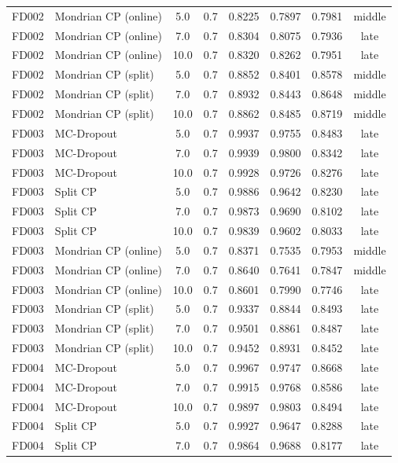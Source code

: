 \begin{table}[t]
\begin{tabular}{llcccccc}
FD002 & Mondrian CP (online) & 5.0 & 0.7 & 0.8225 & 0.7897 & 0.7981 & middle \\
FD002 & Mondrian CP (online) & 7.0 & 0.7 & 0.8304 & 0.8075 & 0.7936 & late \\
FD002 & Mondrian CP (online) & 10.0 & 0.7 & 0.8320 & 0.8262 & 0.7951 & late \\
FD002 & Mondrian CP (split) & 5.0 & 0.7 & 0.8852 & 0.8401 & 0.8578 & middle \\
FD002 & Mondrian CP (split) & 7.0 & 0.7 & 0.8932 & 0.8443 & 0.8648 & middle \\
FD002 & Mondrian CP (split) & 10.0 & 0.7 & 0.8862 & 0.8485 & 0.8719 & middle \\
FD003 & MC-Dropout & 5.0 & 0.7 & 0.9937 & 0.9755 & 0.8483 & late \\
FD003 & MC-Dropout & 7.0 & 0.7 & 0.9939 & 0.9800 & 0.8342 & late \\
FD003 & MC-Dropout & 10.0 & 0.7 & 0.9928 & 0.9726 & 0.8276 & late \\
FD003 & Split CP & 5.0 & 0.7 & 0.9886 & 0.9642 & 0.8230 & late \\
FD003 & Split CP & 7.0 & 0.7 & 0.9873 & 0.9690 & 0.8102 & late \\
FD003 & Split CP & 10.0 & 0.7 & 0.9839 & 0.9602 & 0.8033 & late \\
FD003 & Mondrian CP (online) & 5.0 & 0.7 & 0.8371 & 0.7535 & 0.7953 & middle \\
FD003 & Mondrian CP (online) & 7.0 & 0.7 & 0.8640 & 0.7641 & 0.7847 & middle \\
FD003 & Mondrian CP (online) & 10.0 & 0.7 & 0.8601 & 0.7990 & 0.7746 & late \\
FD003 & Mondrian CP (split) & 5.0 & 0.7 & 0.9337 & 0.8844 & 0.8493 & late \\
FD003 & Mondrian CP (split) & 7.0 & 0.7 & 0.9501 & 0.8861 & 0.8487 & late \\
FD003 & Mondrian CP (split) & 10.0 & 0.7 & 0.9452 & 0.8931 & 0.8452 & late \\
FD004 & MC-Dropout & 5.0 & 0.7 & 0.9967 & 0.9747 & 0.8668 & late \\
FD004 & MC-Dropout & 7.0 & 0.7 & 0.9915 & 0.9768 & 0.8586 & late \\
FD004 & MC-Dropout & 10.0 & 0.7 & 0.9897 & 0.9803 & 0.8494 & late \\
FD004 & Split CP & 5.0 & 0.7 & 0.9927 & 0.9647 & 0.8288 & late \\
FD004 & Split CP & 7.0 & 0.7 & 0.9864 & 0.9688 & 0.8177 & late \\

\end{tabular}
\end{table}
